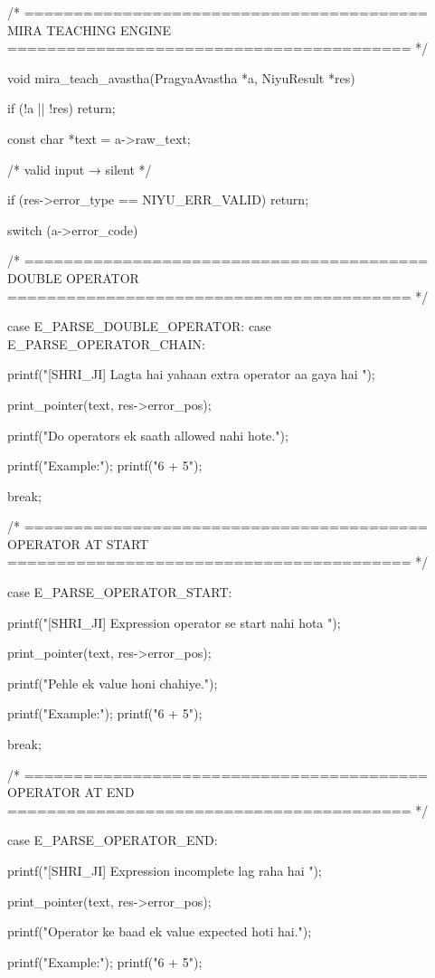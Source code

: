 \documentclass{article}
\begin{document}
/* =========================================
   MIRA TEACHING ENGINE
========================================= */

void mira_teach_avastha(PragyaAvastha *a, NiyuResult *res)
{
    if (!a || !res)
        return;

    const char *text = a->raw_text;


    /* valid input → silent */

    if (res->error_type == NIYU_ERR_VALID)
        return;


    switch (a->error_code)
    {

    /* =========================================
       DOUBLE OPERATOR
    ========================================= */

    case E_PARSE_DOUBLE_OPERATOR:
    case E_PARSE_OPERATOR_CHAIN:

        printf("[SHRI_JI] Lagta hai yahaan extra operator aa gaya hai \n\n");

        print_pointer(text, res->error_pos);

        printf("Do operators ek saath allowed nahi hote.\n\n");

        printf("Example:\n");
        printf("6 + 5\n");

        break;


    /* =========================================
       OPERATOR AT START
    ========================================= */

    case E_PARSE_OPERATOR_START:

        printf("[SHRI_JI] Expression operator se start nahi hota \n\n");

        print_pointer(text, res->error_pos);

        printf("Pehle ek value honi chahiye.\n\n");

        printf("Example:\n");
        printf("6 + 5\n");

        break;


    /* =========================================
       OPERATOR AT END
    ========================================= */

    case E_PARSE_OPERATOR_END:

        printf("[SHRI_JI] Expression incomplete lag raha hai \n\n");

        print_pointer(text, res->error_pos);

        printf("Operator ke baad ek value expected hoti hai.\n\n");

        printf("Example:\n");
        printf("6 + 5\n");

}}
\end{document}
